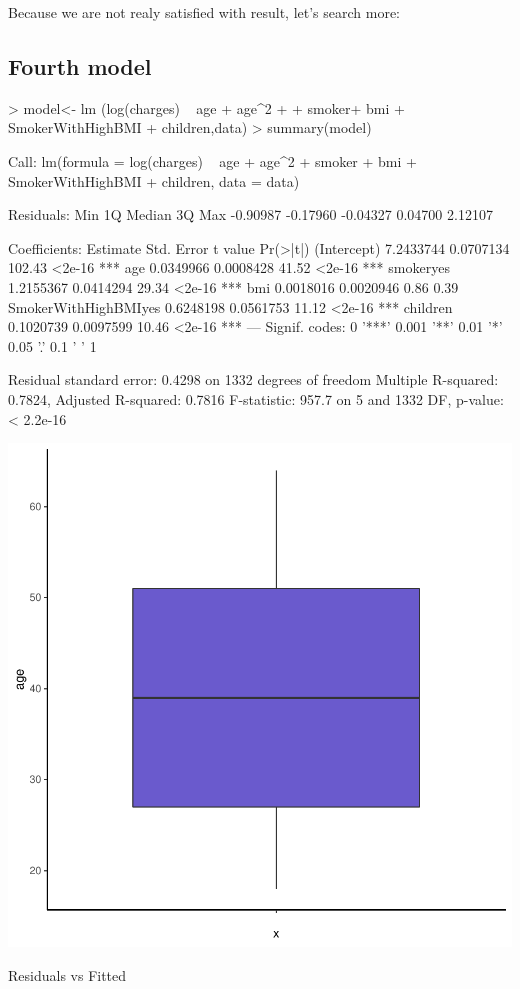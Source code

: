 \documentclass{article}
\begin{document}
Because we are not realy satisfied with result, let's search more:

\subsection{Fourth model}
\label{sec:Fourth}
\begin{Schunk}
\begin{Sinput}
> model<- lm (log(charges) ~ age  + age^2 + 
+               smoker+ bmi + SmokerWithHighBMI + children,data)
> summary(model)
\end{Sinput}
\begin{Soutput}
Call:
lm(formula = log(charges) ~ age + age^2 + smoker + bmi + SmokerWithHighBMI + 
    children, data = data)

Residuals:
     Min       1Q   Median       3Q      Max 
-0.90987 -0.17960 -0.04327  0.04700  2.12107 

Coefficients:
                      Estimate Std. Error t value Pr(>|t|)    
(Intercept)          7.2433744  0.0707134  102.43   <2e-16 ***
age                  0.0349966  0.0008428   41.52   <2e-16 ***
smokeryes            1.2155367  0.0414294   29.34   <2e-16 ***
bmi                  0.0018016  0.0020946    0.86     0.39    
SmokerWithHighBMIyes 0.6248198  0.0561753   11.12   <2e-16 ***
children             0.1020739  0.0097599   10.46   <2e-16 ***
---
Signif. codes:  0 '***' 0.001 '**' 0.01 '*' 0.05 '.' 0.1 ' ' 1

Residual standard error: 0.4298 on 1332 degrees of freedom
Multiple R-squared:  0.7824,	Adjusted R-squared:  0.7816 
F-statistic: 957.7 on 5 and 1332 DF,  p-value: < 2.2e-16
\end{Soutput}
\end{Schunk}

\begin{centerfig}
\includegraphics{Untitled-064}
\caption{Residuals vs Fitted}
\end{centerfig}
\end{document}
